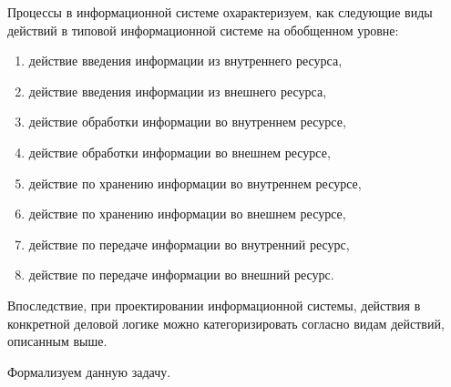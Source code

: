 Процессы в информационной системе охарактеризуем, как следующие виды действий в типовой информационной системе на обобщенном уровне:
\begin{enumerate}
    \item действие введения информации из внутреннего ресурса,
    \item действие введения информации из внешнего ресурса,
    \item действие обработки информации во внутреннем ресурсе,
    \item действие обработки информации во внешнем ресурсе,
    \item действие по хранению информации во внутреннем ресурсе,
    \item действие по хранению информации во внешнем ресурсе,
    \item действие по передаче информации во внутренний ресурс,
    \item действие по передаче информации во внешний ресурс.
\end{enumerate}


Впоследствие, при проектировании информационной системы, действия в конкретной деловой логике можно категоризировать согласно видам действий, описанным выше.

Формализуем данную задачу. 

